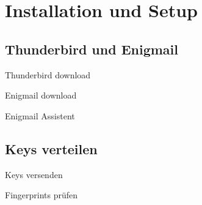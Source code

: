 \section{Installation und Setup}
\subsection{Thunderbird und Enigmail}
\begin{frame}{Thunderbird download}
\end{frame}

\begin{frame}{Enigmail download}
\end{frame}

\begin{frame}{Enigmail Assistent}
\end{frame}

\subsection{Keys verteilen}
\begin{frame}{Keys versenden}
\end{frame}

\begin{frame}{Fingerprints prüfen}
\end{frame}

